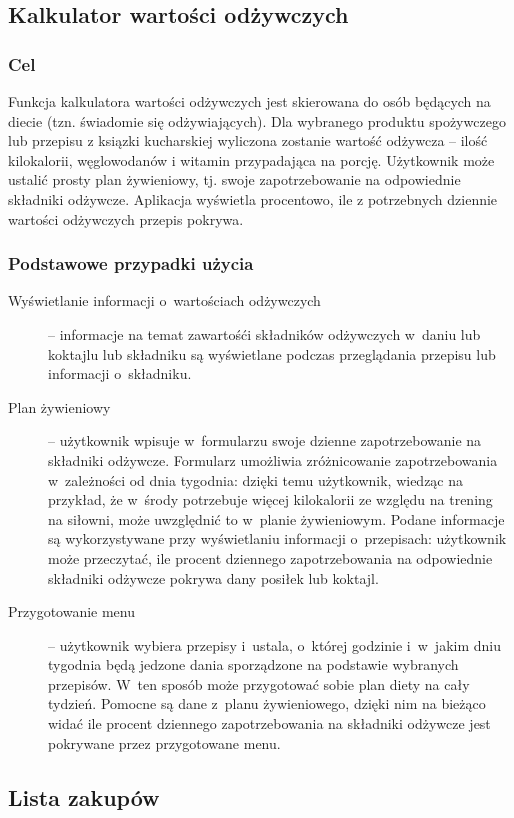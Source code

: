 \documentclass[a4paper,11pt,titlepage,twoside]{mwart}
\begin{document}
\subsection{Kalkulator wartości odżywczych}
\subsubsection{Cel}
Funkcja kalkulatora wartości odżywczych jest skierowana do osób będących na diecie (tzn. świadomie się odżywiających). Dla wybranego produktu spożywczego lub przepisu z ksiązki kucharskiej wyliczona zostanie wartość odżywcza -- ilość kilokalorii, węglowodanów i witamin przypadająca na porcję. Użytkownik może ustalić prosty plan żywieniowy, tj. swoje zapotrzebowanie na odpowiednie składniki odżywcze. Aplikacja wyświetla procentowo, ile z potrzebnych dziennie wartości odżywczych przepis pokrywa.
\subsubsection{Podstawowe przypadki użycia}
\begin{description}
  \item[Wyświetlanie informacji o~wartościach odżywczych] -- informacje na temat zawartośći składników odżywczych w~daniu lub koktajlu lub składniku są wyświetlane podczas przeglądania przepisu lub informacji o~składniku.
  \item[Plan żywieniowy] -- użytkownik wpisuje w~formularzu swoje dzienne zapotrzebowanie na składniki odżywcze. Formularz umożliwia zróżnicowanie zapotrzebowania w~zależności od dnia tygodnia: dzięki temu użytkownik, wiedząc na przykład, że w~środy potrzebuje więcej kilokalorii ze względu na trening na siłowni, może uwzględnić to w~planie żywieniowym. Podane informacje są wykorzystywane przy wyświetlaniu informacji o~przepisach: użytkownik może przeczytać, ile procent dziennego zapotrzebowania na odpowiednie składniki odżywcze pokrywa dany posiłek lub koktajl.
  \item[Przygotowanie menu] -- użytkownik wybiera przepisy i~ustala, o~której godzinie i~w~jakim dniu tygodnia będą jedzone dania sporządzone na podstawie wybranych przepisów. W~ten sposób może przygotować sobie plan diety na cały tydzień. Pomocne są dane z~planu żywieniowego, dzięki nim na bieżąco widać ile procent dziennego zapotrzebowania na składniki odżywcze jest pokrywane przez przygotowane menu.
\end{description}
\subsection{Lista zakupów}
\end{document}
